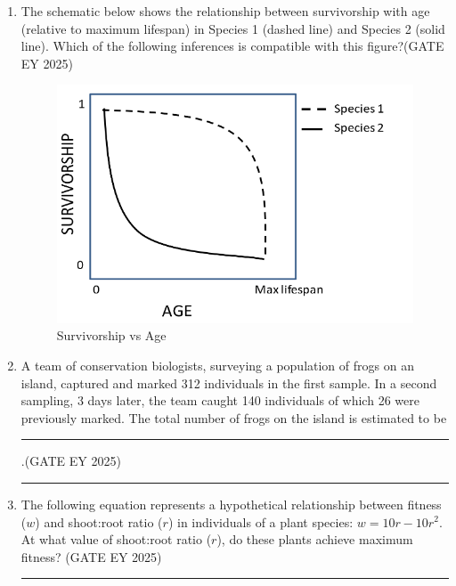 \begin{enumerate}[leftmargin=*,label=\textbf{Q.\arabic*},resume]
\item The schematic below shows the relationship between survivorship with age (relative to maximum lifespan) in Species 1 (dashed line) and Species 2 (solid line). Which of the following inferences is compatible with this figure?\hfill {(GATE EY 2025)}

\begin{figure}[H]
    \centering
    \includegraphics[width=0.9\columnwidth]{figs/imageQ52.png}
    \caption{Survivorship vs Age}
    \label{fig:q52-scbematic}
\end{figure}



\item A team of conservation biologists, surveying a population of frogs on an island, captured and marked 312 individuals in the first sample. In a second sampling, 3 days later, the team caught 140 individuals of which 26 were previously marked. The total number of frogs on the island is estimated to be \rule{4cm}{0.15mm}.\hfill {(GATE EY 2025)}

\rule{4cm}{0.15mm}

\item The following equation represents a hypothetical relationship between fitness ($w$) and shoot:root ratio ($r$) in individuals of a plant species: $w = 10r-10r^2$. At what value of shoot:root ratio ($r$), do these plants achieve maximum fitness?
\hfill {(GATE EY 2025)}
\rule{4cm}{0.15mm}


\end{enumerate}
